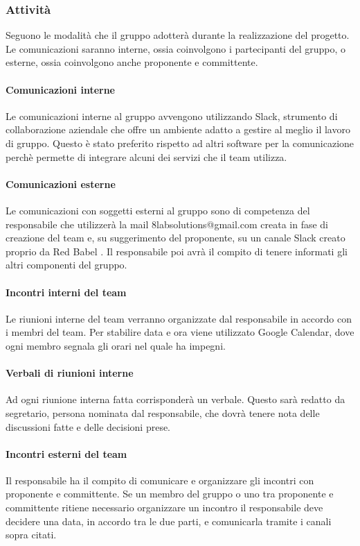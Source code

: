 		\subsubsection{Attività}
		Seguono le modalità che il gruppo adotterà durante la realizzazione del progetto. Le comunicazioni saranno interne, ossia coinvolgono i partecipanti del gruppo, o esterne, ossia coinvolgono anche proponente e committente.
			\paragraph{Comunicazioni interne}
			Le comunicazioni interne al gruppo avvengono utilizzando Slack, strumento di collaborazione aziendale che offre un ambiente adatto a gestire al meglio il lavoro di gruppo. Questo è stato preferito rispetto ad altri software per la comunicazione perchè permette di integrare alcuni dei servizi che il team utilizza.
			\paragraph{Comunicazioni esterne}
				Le comunicazioni con soggetti esterni al gruppo sono di competenza del responsabile che utilizzerà la mail 8labsolutions@gmail.com creata in fase di creazione del team e, su suggerimento del proponente, su un canale Slack creato proprio da Red Babel .  Il responsabile poi avrà il compito di tenere informati gli altri componenti del gruppo.
			\paragraph{Incontri interni del team}
			Le riunioni interne del team verranno organizzate dal responsabile in accordo con i membri del team. Per stabilire data e ora viene utilizzato Google Calendar, dove ogni membro segnala gli orari nel quale ha impegni.
			\paragraph{Verbali di riunioni interne}
			Ad ogni riunione interna fatta corrisponderà un verbale. Questo sarà redatto da segretario, persona nominata dal responsabile, che dovrà tenere nota delle discussioni fatte e delle decisioni prese. 
			\paragraph{Incontri esterni del team}
			Il responsabile ha il compito di comunicare e organizzare gli incontri con  proponente e committente. Se un membro del gruppo o uno tra proponente e committente ritiene necessario organizzare un incontro il responsabile deve decidere una data, in accordo tra le due parti, e comunicarla tramite i canali sopra citati.
